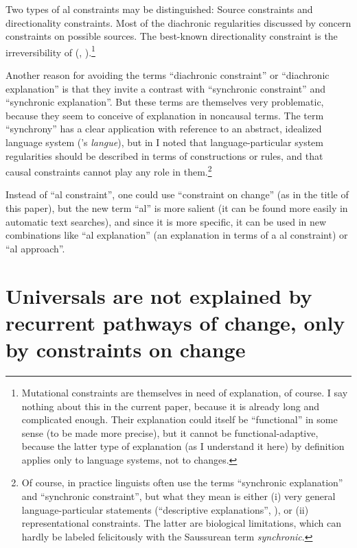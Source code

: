 \documentclass[output=paper]{langsci/langscibook}
\begin{document}
Two types of al constraints may be distinguished: Source constraints and directionality constraints. Most of the diachronic regularities discussed by \citet{Cristofaro2017} concern constraints on possible sources. The best-known directionality constraint is the irreversibility of  (\citealt{Haspelmath1999_Irrev}, \citeyear*{ Haspelmath2004_Direction}).\footnote{Mutational constraints 
\label{fn:haspelmath:mutationalconstraints}
are themselves in need of explanation, of course. I say nothing about this in the current paper, because it is already long and complicated enough. Their explanation could itself be “functional” in some sense (to be made more precise), but it cannot be functional-adaptive, because the latter type of explanation (as I understand it here) by definition applies only to language systems, not to changes.} 

Another reason for avoiding the terms “diachronic constraint” or “diachronic explanation” is that they invite a contrast with “synchronic constraint” and “synchronic explanation”. But these terms are themselves very problematic, because they seem to conceive of explanation in noncausal terms. The term “synchrony” has a clear application with reference to an abstract, idealized language system (’s \textit{langue}), but in  I noted that language-particular system regularities should be described in terms of constructions or rules, and that causal constraints cannot play any role in them.\footnote{Of course, in practice linguists often use the terms “synchronic explanation” and “synchronic constraint”, but what they mean is either (i) very general language-particular statements (“descriptive explanations”, ), or (ii) representational constraints. The latter are biological limitations, which can hardly be labeled felicitously with the Saussurean  term \textit{synchronic}.} 

Instead of “al constraint”, one could use  “constraint on change” (as in the title of this paper), but the new term “al” is more salient (it can be found more easily in automatic text searches), and since it is more specific, it can be used in new combinations like “al explanation” (an explanation in terms of a al constraint) or “al approach”.

\section{Universals are not explained by recurrent pathways of change, only by constraints on change}\label{sec:haspelmath:4}
\end{document}
